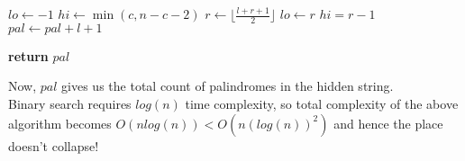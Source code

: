 \documentclass[]{article}
\begin{document}
{\begin{algorithmic}
			 
			\State $lo \gets -1$ 
			\State $hi \gets \min(c, n - c -2)$
			\State $r \gets \lfloor \frac{l+r+1}{2}\rfloor$
				\State $lo \gets r$
			\Else
				\State $hi = r - 1$
			\EndIf
			\State $pal \gets pal + l + 1$ 
			\EndWhile
			\EndFor  
			
			\State \textbf{return} $pal$ 
		\end{algorithmic}
		Now, $pal$ gives us the total count of palindromes in the hidden string.\\
		Binary search requires $log(n)$ time complexity, so total complexity of the above algorithm becomes $O(n log(n)) < O(n (log(n))^2)$ and hence the place doesn't collapse!
	}
\end{document}
